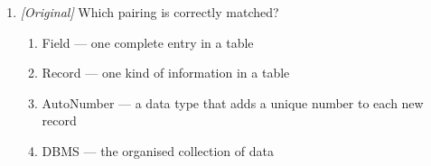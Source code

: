\documentclass[11pt]{article}
\begin{document}
\begin{enumerate}[label=\textbf{Q\arabic*.}, leftmargin=*]
\begin{enumerate}[label=\Roman*.]
    \item A record is a row in a table.
    \item A table is a collection of related records.
  \end{enumerate}
  \begin{enumerate}[label=\Alph*.]
    \item I only
    \item I and II only
    \item II and III only
    \item I, II, and III
  \end{enumerate}
\item \textit{[Original]} Which pairing is correctly matched?
  \begin{enumerate}[label=\Alph*.]
    \item Field --- one complete entry in a table
    \item Record --- one kind of information in a table
    \item AutoNumber --- a data type that adds a unique number to each new
      record
    \item DBMS --- the organised collection of data
  \end{enumerate}


\end{enumerate}
\end{document}
